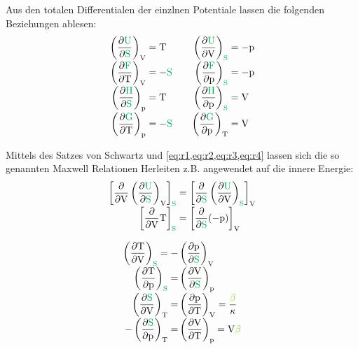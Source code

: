 \begin{sectionbox}[Relationen]\nospacing
  Aus den totalen Differentialen der einzlnen Potentiale lassen die folgenden Beziehungen ablesen:
  \begin{align}
      \left(\pfrac{\Upot}{\Spot}\right)_{\Vz}&=\Tz&&&\left(\pfrac{\Upot}{\Vz}\right)_{\Spot}&=-\pz\label{eq:r1}\nalign
      \left(\pfrac{\Fpot}{\Tz}\right)_{\Vz}&=-\Spot&&&\left(\pfrac{\Fpot}{\pz}\right)_{\Spot}&=-\pz\label{eq:r2}\nalign
      \left(\pfrac{\Hpot}{\Spot}\right)_{\pz}&=\Tz&&&\left(\pfrac{\Hpot}{\pz}\right)_{\Spot}&=\Vz\label{eq:r3}\nalign
      \left(\pfrac{\Gpot}{\Tz}\right)_{\pz}&=-\Spot&&&\left(\pfrac{\Gpot}{\pz}\right)_{\Tz}&=\Vz\label{eq:r4}
  \end{align}
\end{sectionbox}
\begin{sectionbox}\nospacing
  Mittels des Satzes von Schwartz und \cref{eq:r1,eq:r2,eq:r3,eq:r4} lassen sich die so genannten Maxwell Relationen Herleiten z.B. angewendet auf die innere Energie:
  \begin{align*}
    \left[\frac{\partial}{\partial\Vz}\left(\pfrac{\Upot}{\Spot}\right)_{\Vz}\right]_{\Spot}&=\left[\frac{\partial}{\partial\Spot}\left(\pfrac{\Upot}{\Vz}\right)_{\Spot}\right]_{\Vz}\nalign
    \left[\frac{\partial}{\partial\Vz}\Tz\right]_{\Spot}&=\left[\frac{\partial}{\partial\Spot}(-\pz)\right]_{\Vz}
  \end{align*}
\end{sectionbox}
\begin{lawbox}\nospacing
  \begin{law}
  \begin{align}
    \left(\pfrac{\Tz}{\Vz}\right)_{\Spot}=-&\left(\pfrac{\pz}{\Spot}\right)_{\Vz}\nalign
    \left(\pfrac{\Tz}{\pz}\right)_{\Spot}=&\left(\pfrac{\Vz}{\Spot}\right)_{\pz}\nalign
    \left(\pfrac{\Spot}{\Vz}\right)_{\Tz}=&\left(\pfrac{\pz}{\Tz}\right)_{\Vz}=\frac{\betac}{\kappa}\nalign
    -\left(\pfrac{\Spot}{\pz}\right)_{\Tz}=&\left(\pfrac{\Vz}{\Tz}\right)_{\pz}=\Vz\betac
  \end{align}
  \end{law}
\end{lawbox}
